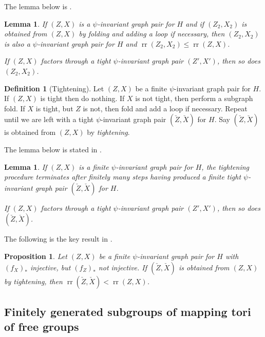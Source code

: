 \documentclass[11pt, a4paper]{amsart}
\newtheorem{lemma}[theorem]{Lemma}
\newtheorem{proposition}[theorem]{Proposition}
\theoremstyle{definition}
\newtheorem{definition}[theorem]{Definition}
\DeclareMathOperator{\rr}{rr}
\begin{document}
The lemma below is \cite[Lemma 4.7]{FH99}.

\begin{lemma}
\label{lem:graph_pair_faalin}
If $(Z, X)$ is a $\psi$-invariant graph pair for $H$ and if $(Z_2, X_2)$ is obtained from $(Z, X)$ by folding and adding a loop if necessary, then $(Z_2, X_2)$ is also a $\psi$-invariant graph pair for $H$ and $\rr(Z_2, X_2)\leqslant \rr(Z, X)$.

If $(Z, X)$ factors through a tight $\psi$-invariant graph pair $(Z', X')$, then so does $(Z_2, X_2)$.
\end{lemma}


\begin{definition}[Tightening]
Let $(Z, X)$ be a finite $\psi$-invariant graph pair for $H$. If $(Z, X)$ is tight then do nothing. If $X$ is not tight, then perform a subgraph fold. If $X$ is tight, but $Z$ is not, then fold and add a loop if necessary. Repeat until we are left with a tight $\psi$-invariant graph pair $(\check{Z}, \check{X})$ for $H$. Say $(\check{Z}, \check{X})$ is obtained from $(Z, X)$ by \emph{tightening}.
\end{definition}

The lemma below is stated in \cite[Definition 4.6]{FH99}.

\begin{lemma}
\label{lem:FH_tightening}
If $(Z, X)$ is a finite $\psi$-invariant graph pair for $H$, the tightening procedure terminates after finitely many steps having produced a finite tight $\psi$-invariant graph pair $(\check{Z}, \check{X})$ for $H$.

If $(Z, X)$ factors through a tight $\psi$-invariant graph pair $(Z', X')$, then so does $(\check{Z}, \check{X})$.
\end{lemma}



The following is the key result in \cite[Proposition 5.4]{FH99}.

\begin{proposition}
\label{prop:FH}
Let $(Z, X)$ be a finite $\psi$-invariant graph pair for $H$ with $(f_X)_*$ injective, but $(f_Z)_*$ not injective. If $(\check{Z}, \check{X})$ is obtained from $(Z, X)$ by tightening, then $\rr(\check{Z}, \check{X})<\rr(Z, X)$.
\end{proposition}



\subsection{Finitely generated subgroups of mapping tori of free groups}
\end{document}

